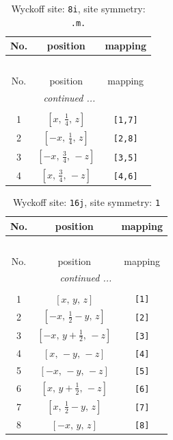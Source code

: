 \documentclass[fleqn,8pt]{jsarticle}
\begin{document}
\renewcommand{\arraystretch}{1.2}
\begin{longtable}{ccc}
\caption{Wyckoff site: {\tt 8i}, site symmetry: {\tt .m.}}
 \\
 \hline \hline
No. & position & mapping \\ \hline \endfirsthead

\multicolumn{2}{l}{\tablename\ \thetable{}} \\
 \hline \hline
No. & position & mapping \\ \hline \endhead

 \hline \hline
\multicolumn{2}{r}{\footnotesize\it continued ...} \\ \endfoot

 \hline \hline
\multicolumn{2}{r}{} \\ \endlastfoot

1 & $\left[ x,\, \frac{1}{4},\, z \right]$ & {\tt [1,7]} \\ \hline
2 & $\left[ - x,\, \frac{1}{4},\, z \right]$ & {\tt [2,8]} \\ \hline
3 & $\left[ - x,\, \frac{3}{4},\, - z \right]$ & {\tt [3,5]} \\ \hline
4 & $\left[ x,\, \frac{3}{4},\, - z \right]$ & {\tt [4,6]} \\
\end{longtable}
\renewcommand{\arraystretch}{1.2}
\begin{longtable}{ccc}
\caption{Wyckoff site: {\tt 16j}, site symmetry: {\tt 1}}
 \\
 \hline \hline
No. & position & mapping \\ \hline \endfirsthead

\multicolumn{2}{l}{\tablename\ \thetable{}} \\
 \hline \hline
No. & position & mapping \\ \hline \endhead

 \hline \hline
\multicolumn{2}{r}{\footnotesize\it continued ...} \\ \endfoot

 \hline \hline
\multicolumn{2}{r}{} \\ \endlastfoot

1 & $\left[ x,\, y,\, z \right]$ & {\tt [1]} \\ \hline
2 & $\left[ - x,\, \frac{1}{2} - y,\, z \right]$ & {\tt [2]} \\ \hline
3 & $\left[ - x,\, y + \frac{1}{2},\, - z \right]$ & {\tt [3]} \\ \hline
4 & $\left[ x,\, - y,\, - z \right]$ & {\tt [4]} \\ \hline
5 & $\left[ - x,\, - y,\, - z \right]$ & {\tt [5]} \\ \hline
6 & $\left[ x,\, y + \frac{1}{2},\, - z \right]$ & {\tt [6]} \\ \hline
7 & $\left[ x,\, \frac{1}{2} - y,\, z \right]$ & {\tt [7]} \\ \hline
8 & $\left[ - x,\, y,\, z \right]$ & {\tt [8]} \\
\end{longtable}
\end{document}
